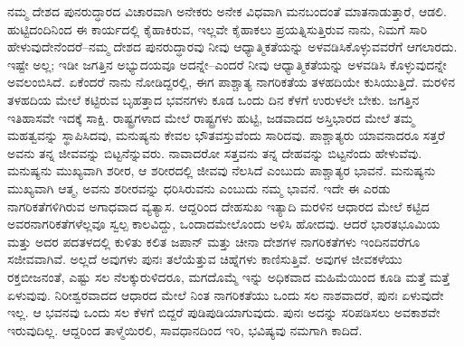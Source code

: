 ನಮ್ಮ ದೇಶದ ಪುನರುದ್ಧಾರದ ವಿಚಾರವಾಗಿ ಅನೇಕರು ಅನೇಕ ವಿಧವಾಗಿ ಮನಬಂದಂತೆ ಮಾತನಾಡುತ್ತಾರೆ, ಆಡಲಿ. ಹುಟ್ಟಿದಂದಿನಿಂದ ಈ ಕಾರ್ಯದಲ್ಲಿ ಕೈಹಾಕಿರುವ, ಇಲ್ಲವೇ ಕೈಹಾಕಲು ಪ್ರಯತ್ನಿಸುತ್ತಿರುವ ನಾನು, ನಿಮಗೆ ಸಾರಿ ಹೇಳುವುದೇನೆಂದರೆ–ನಮ್ಮ ದೇಶದ ಪುನರುದ್ಧಾರವು ನೀವು ಆಧ್ಯಾತ್ಮಿಕತೆಯನ್ನು ಅಳವಡಿಸಿಕೊಳ್ಳುವವರೆಗೆ ಆಗಲಾರದು. ಇಷ್ಟೇ ಅಲ್ಲ; ಇಡೀ ಜಗತ್ತಿನ ಅಭ್ಯುದಯವೂ ಅದನ್ನೇ–ಎಂದರೆ ನೀವು ಆಧ್ಯಾತ್ಮಿಕತೆಯನ್ನು ಅಳವಡಿಸಿ ಕೊಳ್ಳುವುದನ್ನೇ ಅವಲಂಬಿಸಿದೆ. ಏಕೆಂದರೆ ನಾನು ನೋಡಿದ್ದರಲ್ಲಿ, ಈಗ ಪಾಶ್ಚಾತ್ಯ ನಾಗರಿಕತೆಯ ತಳಹದಿಯೇ ಕುಸಿಯುತ್ತಿದೆ. ಮರಳಿನ ತಳಹದಿಯ ಮೇಲೆ ಕಟ್ಟಿರುವ ಬೃಹತ್ತಾದ ಭವನಗಳು ಕೂಡ ಒಂದು ದಿನ ಕೆಳಗೆ ಉರುಳಲೇ ಬೇಕು. ಜಗತ್ತಿನ ಇತಿಹಾಸವೇ ಇದಕ್ಕೆ ಸಾಕ್ಷಿ. ರಾಷ್ಟ್ರಗಳಾದ ಮೇಲೆ ರಾಷ್ಟ್ರಗಳು ಹುಟ್ಟಿ, ಜಡವಾದದ ಅಸ್ತಿಭಾರದ ಮೇಲೆ ತಮ್ಮ ಮಹತ್ವವನ್ನು ಸ್ಥಾಪಿಸಿದವು, ಮನುಷ್ಯನು ಕೇವಲ ಭೌತವಸ್ತುವೆಂದು ಸಾರಿದವು. ಪಾಶ್ಚಾತ್ಯರು ಯಾವನಾದರೂ ಸತ್ತರೆ ಅವನು ತನ್ನ ಜೀವವನ್ನು ಬಿಟ್ಟನೆನ್ನುವರು. ನಾವಾದರೋ ಸತ್ತವನು ತನ್ನ ದೇಹವನ್ನು ಬಿಟ್ಟನೆಂದು ಹೇಳುವೆವು. ಮನುಷ್ಯನು ಮುಖ್ಯವಾಗಿ ಶರೀರ, ಆ ಶರೀರದಲ್ಲಿ ಜೀವವು ನೆಲಸಿದೆ ಎಂಬುದು ಪಾಶ್ಚಾತ್ಯರ ಭಾವನೆ. ಮನುಷ್ಯನು ಮುಖ್ಯವಾಗಿ ಆತ್ಮ, ಅವನು ಶರೀರವನ್ನು ಧರಿಸಿರುವನು ಎಂಬುದು ನಮ್ಮ ಭಾವನೆ. ಇದೇ ಈ ಎರಡು ನಾಗರಿಕತೆಗಳಿಗಿರುವ ಅಗಾಧವಾದ ವ್ಯತ್ಯಾಸ. ಆದ್ದರಿಂದ ದೇಹಸುಖ ಇತ್ಯಾದಿ ಮರಳಿನ ಆಧಾರದ ಮೇಲೆ ಕಟ್ಟಿದ ಅವರ\break ನಾಗರಿಕತೆಗಳೆಲ್ಲವೂ ಸ್ವಲ್ಪ ಕಾಲವಿದ್ದು, ಒಂದಾದಮೇಲೊಂದು ಅಳಿಸಿ ಹೋದವು. ಆದರೆ ಭಾರತಭೂಮಿಯ ಮತ್ತು ಅದರ ಪದತಳದಲ್ಲಿ ಕುಳಿತು ಕಲಿತ ಜಪಾನ್​ ಮತ್ತು ಚೀನಾ ದೇಶಗಳ ನಾಗರಿಕತೆಗಳು ಇಂದಿನವರೆಗೂ ಸಜೀವವಾಗಿವೆ. ಅಲ್ಲದೆ ಅವುಗಳು ಪುನಃ ತಲೆಯೆತ್ತುವ ಚಿಹ್ನೆಗಳು ಕಾಣಿಸುತ್ತಿವೆ. ಅವುಗಳ ಜೀವಕಳೆಯು ರಕ್ತಬೀಜನಂತೆ, ಎಷ್ಟು ಸಲ ನೆಲಕ್ಕುರುಳಿದರೂ, ಮಗದೊಮ್ಮೆ ಇನ್ನು ಅಧಿಕವಾದ ಮಹಿಮೆಯಿಂದ ಕೂಡಿ ಮತ್ತೆ ಮತ್ತೆ ಏಳುವುವು. ನಿರೀಶ್ವರವಾದದ ಆಧಾರದ ಮೇಲೆ ನಿಂತ ನಾಗರಿಕತೆಯು ಒಂದು ಸಲ ನಾಶವಾದರೆ, ಪುನಃ ಏಳುವುದೇ ಇಲ್ಲ. ಆ ಭವನವು ಒಂದು ಸಲ ಕೆಳಗೆ ಬಿದ್ದರೆ ಪುಡಿಪುಡಿಯಾಗುವುದು. ಪುನಃ ಅದನ್ನು ಸರಿಪಡಿಸಲು ಅವಕಾಶವೇ ಇರುವುದಿಲ್ಲ. ಆದ್ದರಿಂದ ತಾಳ್ಮೆಯಿರಲಿ, ಸಾವಧಾನದಿಂದ ಇರಿ, ಭವಿಷ್ಯವು ನಮಗಾಗಿ ಕಾದಿದೆ.

\vskip 2pt

